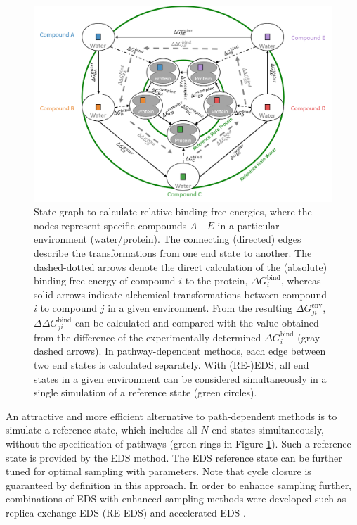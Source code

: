 \begin{figure}[h]
    \centering
    \includegraphics[width=\columnwidth]{fig/intro/State_graph.png}
    \caption{State graph to calculate relative binding free energies, where the nodes represent specific compounds $A$ - $E$ in a particular environment (water/protein). 
    The connecting (directed) edges describe the transformations from one end state to another. The dashed-dotted arrows denote the direct calculation of the (absolute) binding free energy of compound $i$ to the protein, $\Delta G_{i}^\text{bind}$, whereas solid arrows indicate alchemical transformations between compound $i$ to compound $j$ in a given environment. From the resulting $\Delta G_{ji}^\text{env}$, $\Delta \Delta G^\text{bind}_{ji}$ can be calculated and compared with the value obtained from the difference of the experimentally determined $\Delta G_{i}^\text{bind}$ (gray dashed arrows).
    In pathway-dependent methods, each edge between two end states is calculated separately. With (RE-)EDS, all end states in a given environment can be considered simultaneously in a single simulation of a reference state (green circles).}
    \label{fig: StateGraph}
\end{figure}

An attractive and more efficient alternative to path-dependent methods is to simulate a reference state, which includes all $N$ end states simultaneously, without the specification of pathways (green rings in Figure \ref{fig: StateGraph}). Such a reference state is provided by the EDS \cite{Christ2007, Christ2008, Christ2009, Riniker2011} method. The EDS reference state can be further tuned for optimal sampling with parameters. Note that cycle closure is guaranteed by definition in this approach.
%
In order to enhance sampling further, combinations of EDS with enhanced sampling methods were developed such as replica-exchange EDS (RE-EDS) \cite{Lee2014, Sidler2016, Sidler2017} and accelerated EDS \cite{Perthold2018, Perthold2020}.

